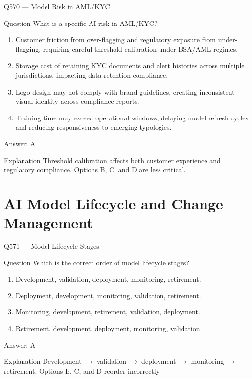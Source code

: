 \documentclass[aspectratio=169,8pt]{beamer}
\begin{document}
	\begin{frame}{Q570 --- Model Risk in AML/KYC}
		\begin{block}{Question}
			What is a specific AI risk in AML/KYC?
			\begin{enumerate}
				\item Customer friction from over-flagging and regulatory exposure from under-flagging, requiring careful threshold calibration under BSA/AML regimes.
				\item Storage cost of retaining KYC documents and alert histories across multiple jurisdictions, impacting data-retention compliance.
				\item Logo design may not comply with brand guidelines, creating inconsistent visual identity across compliance reports.
				\item Training time may exceed operational windows, delaying model refresh cycles and reducing responsiveness to emerging typologies.
			\end{enumerate}
		\end{block}
		\begin{exampleblock}{Answer: A}\end{exampleblock}
		\begin{block}{Explanation}
			Threshold calibration affects both customer experience and regulatory compliance. Options B, C, and D are less critical.
		\end{block}
	\end{frame}
	
	\section{AI Model Lifecycle and Change Management}
	
	\begin{frame}{Q571 --- Model Lifecycle Stages}
		\begin{block}{Question}
			Which is the correct order of model lifecycle stages?
			\begin{enumerate}
				\item Development, validation, deployment, monitoring, retirement.
				\item Deployment, development, monitoring, validation, retirement.
				\item Monitoring, development, retirement, validation, deployment.
				\item Retirement, development, deployment, monitoring, validation.
			\end{enumerate}
		\end{block}
		\begin{exampleblock}{Answer: A}\end{exampleblock}
		\begin{block}{Explanation}
			Development $\to$ validation $\to$ deployment $\to$ monitoring $\to$ retirement. Options B, C, and D reorder incorrectly.
		\end{block}
	\end{frame}
	
\end{document}
